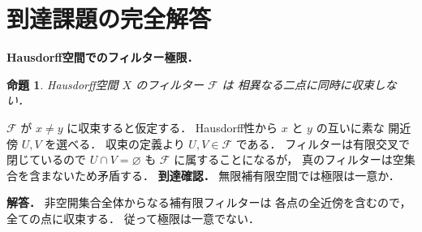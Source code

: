 \documentclass[a5paper,10pt,onecolumn]{jsarticle}
\makeatletter
\theoremstyle{mathnotetheorem}
\newtheorem{proposition}[theorem]{命題}
\renewcommand{\proofname}{証明}
\renewenvironment{proof}[1][\proofname]{%
  \par\pushQED{\qed}\normalfont\topsep4\p@\@plus2\p@\relax
  \trivlist\item[\hskip\labelsep\bfseries #1]\ignorespaces
}{\popQED\endtrivlist\@endpefalse}
\makeatother
\begin{document}
\section{到達課題の完全解答}
\noindent\textbf{Hausdorff空間でのフィルター極限．}
\begin{proposition}
Hausdorff空間 $X$ のフィルター $\mathcal F$ は
相異なる二点に同時に収束しない．
\end{proposition}
\begin{proof}
$\mathcal F$ が $x\ne y$ に収束すると仮定する．
Hausdorff性から $x$ と $y$ の互いに素な
開近傍 $U,V$ を選べる．
収束の定義より $U,V\in\mathcal F$ である．
フィルターは有限交叉で閉じているので
$U\cap V=\varnothing$ も $\mathcal F$ に属することになるが，
真のフィルターは空集合を含まないため矛盾する．
\end{proof}
\noindent\textbf{到達確認．}
無限補有限空間では極限は一意か．
\par\noindent\textbf{解答．}
非空開集合全体からなる補有限フィルターは
各点の全近傍を含むので，全ての点に収束する．
従って極限は一意でない．
\end{document}
